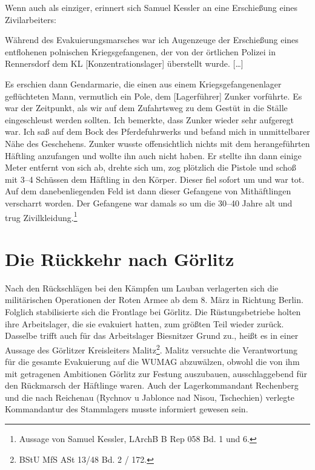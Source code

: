 Wenn auch als einziger, erinnert sich Samuel Kessler an eine Erschießung eines Zivilarbeiters:
\begin{leftbar} 
Während des Evakuierungsmarsches war ich Augenzeuge der Erschießung eines entflohenen polnischen Kriegsgefangenen, der von der örtlichen Polizei in Rennersdorf dem KL [Konzentrationslager] überstellt wurde. [\dots]

Es erschien dann Gendarmarie, die einen aus einem Kriegsgefangenenlager geflüchteten Mann, vermutlich ein Pole, dem [Lagerführer] Zunker vorführte. Es war der Zeitpunkt, als wir auf dem Zufahrtsweg zu dem Gestüt in die Ställe eingeschleust werden sollten. Ich bemerkte, dass Zunker wieder sehr aufgeregt war. Ich saß auf dem Bock des Pferdefuhrwerks und befand mich in unmittelbarer Nähe des Geschehens. Zunker wusste offensichtlich nichts mit dem herangeführten Häftling anzufangen und wollte ihn auch nicht haben. Er stellte ihn dann einige Meter entfernt von sich ab, drehte sich um, zog plötzlich die Pistole und schoß mit 3--4 Schüssen dem Häftling in den Körper. Dieser fiel sofort um und war tot. Auf dem danebenliegenden Feld ist dann dieser Gefangene von Mithäftlingen verscharrt worden. Der Gefangene war damals so um die 30--40 Jahre alt und trug Zivilkleidung.\footnote{Aussage von Samuel Kessler, LArchB B Rep 058 Bd. 1 und 6.}
\end{leftbar}
 








\section{Die Rückkehr nach Görlitz}
Nach den Rückschlägen bei den Kämpfen um Lauban verlagerten sich die militärischen Operationen der Roten Armee ab dem 8. März in Richtung Berlin. Folglich stabilisierte sich die Frontlage bei Görlitz. \glqq Die Rüstungsbetriebe holten ihre Arbeitslager, die sie evakuiert hatten, zum größten Teil wieder zurück. Dasselbe trifft auch für das Arbeitslager Biesnitzer Grund zu.\grqq, heißt es in einer Aussage des Görlitzer Kreisleiters Malitz\footnote{BStU MfS ASt 13/48 Bd. 2 / 172.}. 
Malitz versuchte die Verantwortung für die gesamte Evakuierung auf die WUMAG abzuwälzen, obwohl die von ihm mit getragenen Ambitionen Görlitz zur Festung auszubauen, ausschlaggebend für den Rückmarsch der Häftlinge waren. Auch der Lagerkommandant Rechenberg und die nach Reichenau (Rychnov u Jablonce nad Nisou, Tschechien) verlegte Kommandantur des Stammlagers musste informiert gewesen sein. 

